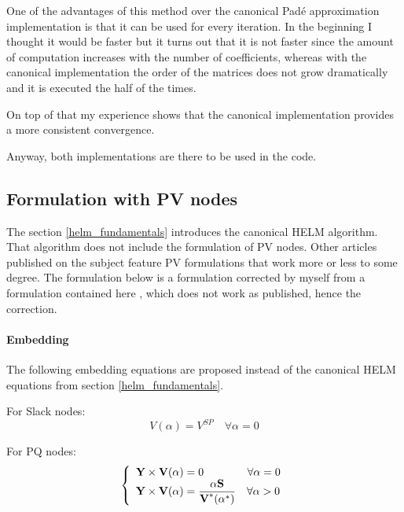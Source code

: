 \documentclass[a4paper,twoside,fleqn]{tufte-book}
\begin{document}
One of the advantages of this method over the canonical Pad\'e approximation implementation is that it can be used for every iteration. In the beginning I thought it would be faster but it turns out that it is not faster since the amount of computation increases with the number of coefficients, whereas with the canonical implementation the order of the matrices does not grow dramatically and it is executed the half of the times.

On top of that my experience shows that the canonical implementation provides a more consistent convergence.

Anyway, both implementations are there to be used in the code.




\subsection{Formulation with PV nodes}

The section \ref{helm_fundamentals} introduces the canonical HELM algorithm. That algorithm does not include the formulation of PV nodes.
Other articles published on the subject feature PV formulations that work more or less to some degree. The formulation below is a formulation corrected by myself from a formulation contained here \cite{liu2017online}, which does not work as published, hence the correction.



\paragraph{Embedding}

The following embedding equations are proposed instead of the canonical HELM equations from section \ref{helm_fundamentals}.

For Slack nodes:
\begin{equation}
V(\alpha) = V^{SP} \quad \forall \alpha=0
\end{equation}

For PQ nodes:
\begin{equation}
\left\{
\begin{array}{ll}
\textbf{Y} \times \textbf{V}(\alpha) = 0 \quad \quad \quad \quad \forall \alpha=0\\
\mathlarger{\textbf{Y} \times \textbf{V}(\alpha) = \frac{\alpha \textbf{S}}{\textbf{V}^*(\alpha^*)}} \quad \forall \alpha>0
\end{array}
\right.
\end{equation}
\end{document}
